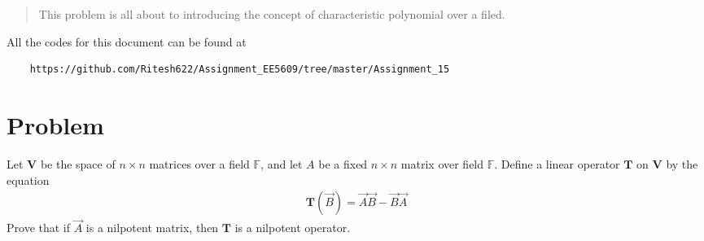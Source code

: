 \documentclass[journal,12pt,twocolumn]{IEEEtran}
\begin{document}
	
	\maketitle
	\newpage
	\bigskip
	\renewcommand{\thefigure}{\theenumi}
	\renewcommand{\thetable}{\theenumi}
	\date{Today}
	
	
	\begin{abstract}
		This problem is all about to  introducing the concept of characteristic polynomial over a filed.
	\end{abstract}
	All the codes for this document can be found at
	\begin{lstlisting}
	https://github.com/Ritesh622/Assignment_EE5609/tree/master/Assignment_15
	\end{lstlisting}
	\section{Problem}
	Let $\mathbf{V}$ be the space of $ n \times n$  matrices over a field $\mathbb{F}$, and let $A$ be a fixed $n \times n $ matrix over field $\mathbb{F}$. Define a linear operator $\mathbf{T}$ on $\mathbf{V}$  by the equation 
	\begin{align}
	\mathbf{T}(\vec{B}) = \vec{A}\vec{B} - \vec{B}\vec{A}
	\end{align}
	Prove that if $\vec{A}$  is a nilpotent matrix, then $\mathbf{T}$ is a nilpotent operator.
	
\end{document}
